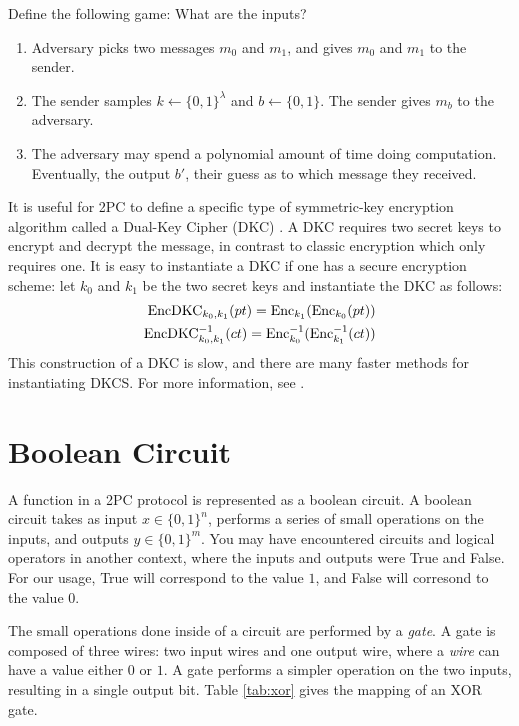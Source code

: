 
\begin{definition}
Define the following game:
What are the inputs?
\begin{enumerate}
\item Adversary picks two messages $m_0$ and $m_1$, and gives $m_0$ and $m_1$ to the sender. 
\item The sender samples $k \gets \{0,1\}^{\lambda}$ and $b \gets \{0,1\}$. The sender gives $m_b$ to the adversary. 
\item The adversary may spend a polynomial amount of time doing computation. Eventually, the output $b'$, their guess as to which message they received.
\end{enumerate}
\end{definition}

It is useful for 2PC to define a specific type of symmetric-key encryption algorithm called a Dual-Key Cipher (DKC) \cite{bellare2012foundations}.
A DKC requires two secret keys to encrypt and decrypt the message, in contrast to classic encryption which only requires one.
It is easy to instantiate a DKC if one has a secure encryption scheme: let $k_0$ and $k_1$ be the two secret keys and instantiate the DKC as follows:
\begin{equation}
    \begin{split}
        \operatorname{EncDKC}_{k_0, k_1}(pt) = \operatorname{Enc}_{k_1} ( \operatorname{Enc}_{k_0} ( pt )) \\
        \operatorname{EncDKC}^{-1}_{k_0, k_1}(ct) = \operatorname{Enc}^{-1}_{k_0} ( \operatorname{Enc}^{-1}_{k_1} ( ct )) 
    \end{split}
\end{equation}
This construction of a DKC is slow, and there are many faster methods for instantiating DKCS.
For more information, see \cite{bellare2012foundations}.

\section{Boolean Circuit} 
A function in a 2PC protocol is represented as a boolean circuit.
A boolean circuit takes as input $x \in \{0,1\}^n$, performs a series of small operations on the inputs, and outputs $y \in \{0,1\}^m$.  
You may have encountered circuits and logical operators in another context, where the inputs and outputs were True and False.
For our usage, True will correspond to the value $1$, and False will corresond to the value $0$. 

The small operations done inside of a circuit are performed by a \emph{gate}.
A gate is composed of three wires: two input wires and one output wire, where a \emph{wire} can have a value either $0$ or $1$.
A gate performs a simpler operation on the two inputs, resulting in a single output bit.
Table \ref{tab:xor} gives the mapping of an XOR gate.

